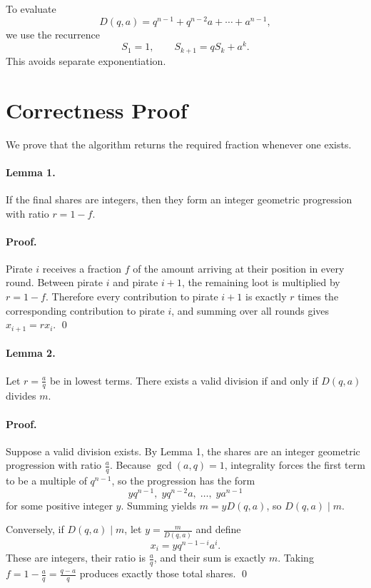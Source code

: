 \documentclass[11pt]{article}
\begin{document}
To evaluate
\[
    D(q,a) = q^{n-1} + q^{n-2}a + \cdots + a^{n-1},
\]
we use the recurrence
\[
    S_1 = 1, \qquad S_{k+1} = qS_k + a^k.
\]
This avoids separate exponentiation.

\section*{Correctness Proof}

We prove that the algorithm returns the required fraction whenever one exists.

\paragraph{Lemma 1.}
If the final shares are integers, then they form an integer geometric progression with ratio $r=1-f$.

\paragraph{Proof.}
Pirate $i$ receives a fraction $f$ of the amount arriving at their position in every round. Between pirate
$i$ and pirate $i+1$, the remaining loot is multiplied by $r=1-f$. Therefore every contribution to pirate
$i+1$ is exactly $r$ times the corresponding contribution to pirate $i$, and summing over all rounds gives
$x_{i+1}=r x_i$. \qed

\paragraph{Lemma 2.}
Let $r=\frac{a}{q}$ be in lowest terms. There exists a valid division if and only if
$D(q,a)$ divides $m$.

\paragraph{Proof.}
Suppose a valid division exists. By Lemma 1, the shares are an integer geometric progression with ratio
$\frac{a}{q}$. Because $\gcd(a,q)=1$, integrality forces the first term to be a multiple of $q^{n-1}$, so
the progression has the form
\[
    y q^{n-1},\; y q^{n-2}a,\; \dots,\; y a^{n-1}
\]
for some positive integer $y$. Summing yields $m = y D(q,a)$, so $D(q,a)\mid m$.

Conversely, if $D(q,a)\mid m$, let $y = \frac{m}{D(q,a)}$ and define
\[
    x_i = y q^{n-1-i} a^i.
\]
These are integers, their ratio is $\frac{a}{q}$, and their sum is exactly $m$. Taking
$f = 1-\frac{a}{q} = \frac{q-a}{q}$ produces exactly those total shares. \qed
\end{document}
